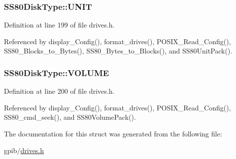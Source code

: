 \subsubsection[{\texorpdfstring{U\+N\+IT}{UNIT}}]{ S\+S80\+Disk\+Type\+::\+U\+N\+IT}\hypertarget{structSS80DiskType_ac630da1440afd60d726c7c41eb7b990c}{}\label{structSS80DiskType_ac630da1440afd60d726c7c41eb7b990c}


Definition at line 199 of file drives.\+h.



Referenced by display\+\_\+\+Config(), format\+\_\+drives(), P\+O\+S\+I\+X\+\_\+\+Read\+\_\+\+Config(), S\+S80\+\_\+\+Blocks\+\_\+to\+\_\+\+Bytes(), S\+S80\+\_\+\+Bytes\+\_\+to\+\_\+\+Blocks(), and S\+S80\+Unit\+Pack().

\subsubsection[{\texorpdfstring{V\+O\+L\+U\+ME}{VOLUME}}]{ S\+S80\+Disk\+Type\+::\+V\+O\+L\+U\+ME}\hypertarget{structSS80DiskType_adef69576dbc48a5d70ff628578d77b60}{}\label{structSS80DiskType_adef69576dbc48a5d70ff628578d77b60}


Definition at line 200 of file drives.\+h.



Referenced by display\+\_\+\+Config(), format\+\_\+drives(), P\+O\+S\+I\+X\+\_\+\+Read\+\_\+\+Config(), S\+S80\+\_\+cmd\+\_\+seek(), and S\+S80\+Volume\+Pack().



The documentation for this struct was generated from the following file\+:\begin{DoxyCompactItemize}
\item 
gpib/\hyperlink{drives_8h}{drives.\+h}\end{DoxyCompactItemize}
